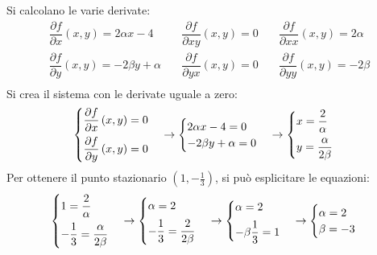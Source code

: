 \documentclass[a4paper]{article}
\begin{document}
	\noindent
	Si calcolano le varie derivate:
	\begin{equation*}
		\begin{array}{rcl}
			\dfrac{\partial f}{\partial x}\left(x,y\right) = 2\alpha x - 4 \hspace{1em}& \dfrac{\partial f}{\partial xy}\left(x,y\right) = 0 \hspace{1em}& \dfrac{\partial f}{\partial xx}\left(x,y\right) = 2\alpha \\ [1em]
			\dfrac{\partial f}{\partial y}\left(x,y\right) = -2\beta y + \alpha \hspace{1em}& \dfrac{\partial f}{\partial yx}\left(x,y\right) = 0 \hspace{1em}& \dfrac{\partial f}{\partial yy}\left(x,y\right) = -2\beta \\ [1em]
		\end{array}
	\end{equation*}
	Si crea il sistema con le derivate uguale a zero:
	\begin{equation*}
		\begin{cases}
			\dfrac{\partial f}{\partial x}\left(x,y\right) = 0 \vspace{.5em}\\
			\dfrac{\partial f}{\partial y}\left(x,y\right) = 0 
		\end{cases}
		\rightarrow
		\begin{cases}
			2\alpha x - 4 = 0 \\
			-2\beta y + \alpha = 0
		\end{cases}
		\rightarrow
		\begin{cases}
			x = \dfrac{2}{\alpha} \vspace{.5em} \\
			y = \dfrac{\alpha}{2\beta}
		\end{cases}
	\end{equation*}
	Per ottenere il punto stazionario $\left(1,-\frac{1}{3}\right)$, si può esplicitare le equazioni:
	\begin{equation*}
		\begin{cases}
			1 = \dfrac{2}{\alpha} \vspace{.5em} \\
			-\dfrac{1}{3} = \dfrac{\alpha}{2\beta}
		\end{cases}
		\rightarrow
		\begin{cases}
			\alpha = 2 \vspace{.5em} \\
			-\dfrac{1}{3} = \dfrac{2}{2\beta}
		\end{cases}
		\rightarrow
		\begin{cases}
			\alpha = 2 \vspace{.5em} \\
			-\beta\dfrac{1}{3} = 1
		\end{cases}
		\rightarrow
		\begin{cases}
			\alpha = 2 \\
			\beta = -3
		\end{cases}
	\end{equation*}
\end{document}
